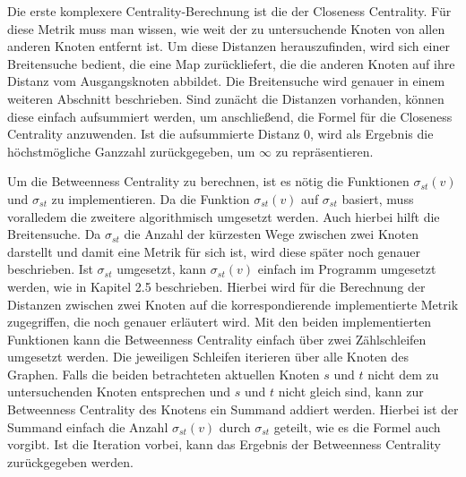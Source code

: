\documentclass[a4paper,12pt,ngerman,chapterprefix=false,listof=totoc,bibliography=totoc]{scrreprt}
\begin{document}
{{{Die erste komplexere Centrality-Berechnung ist die der Closeness Centrality. Für diese Metrik muss man wissen, wie weit der zu untersuchende Knoten von allen anderen Knoten entfernt ist. Um diese Distanzen herauszufinden, wird sich einer Breitensuche bedient, die eine Map zurückliefert, die die anderen Knoten auf ihre Distanz vom Ausgangsknoten abbildet. Die Breitensuche wird genauer in einem weiteren Abschnitt beschrieben. Sind zunächt die Distanzen vorhanden, können diese einfach aufsummiert werden, um anschließend, die Formel für die Closeness Centrality anzuwenden. Ist die aufsummierte Distanz 0, wird als Ergebnis die höchstmögliche Ganzzahl zurückgegeben, um \(\infty\) zu repräsentieren.

Um die Betweenness Centrality zu berechnen, ist es nötig die Funktionen \(\sigma_{st}(v)\) und \(\sigma_{st}\) zu implementieren. Da die Funktion \(\sigma_{st}(v)\) auf \(\sigma_{st}\) basiert, muss voralledem die zweitere algorithmisch umgesetzt werden. Auch hierbei hilft die Breitensuche. Da \(\sigma_{st}\) die Anzahl der kürzesten Wege zwischen zwei Knoten darstellt und damit eine Metrik für sich ist, wird diese später noch genauer beschrieben. Ist \(\sigma_{st}\) umgesetzt, kann \(\sigma_{st}(v)\) einfach im Programm umgesetzt werden, wie in Kapitel 2.5 beschrieben. Hierbei wird für die Berechnung der Distanzen zwischen zwei Knoten auf die korrespondierende implementierte Metrik zugegriffen, die noch genauer erläutert wird. Mit den beiden implementierten Funktionen kann die Betweenness Centrality einfach über zwei Zählschleifen umgesetzt werden. Die jeweiligen Schleifen iterieren über alle Knoten des Graphen. Falls die beiden betrachteten aktuellen Knoten \(s\) und \(t\) nicht dem zu untersuchenden Knoten entsprechen und \(s\) und \(t\) nicht gleich sind, kann zur Betweenness Centrality des Knotens ein Summand addiert werden. Hierbei ist der Summand einfach die Anzahl \(\sigma_{st}(v)\) durch \(\sigma_{st}\) geteilt, wie es die Formel auch vorgibt. Ist die Iteration vorbei, kann das Ergebnis der Betweenness Centrality zurückgegeben werden.

}}}
\end{document}
